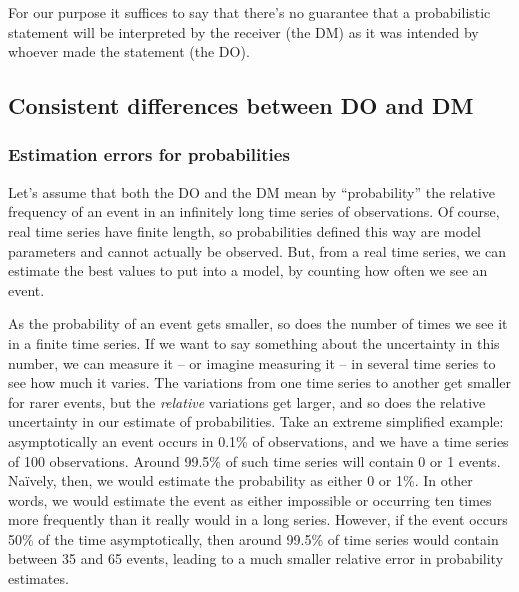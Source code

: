\documentclass[a4paper, 12pt]{article}
\newcommand{\seclabel}[1]{\label{sec:#1}}
\begin{document}
For our purpose it suffices to say that there's no guarantee that a probabilistic statement will be interpreted by the receiver (the DM) as it was intended by whoever made the statement (the DO).

\subsection{Consistent differences between DO and DM \seclabel{condition2}}

\subsubsection*{Estimation errors for probabilities}
Let's assume that both the DO and the DM mean by ``probability'' the relative frequency of an event in an infinitely long time series of observations. Of course, real time series have finite length, so probabilities defined this way are model parameters and cannot actually be observed. But, from a real time series, we can estimate the best values to put into a model, by counting how often we see an event.

As the probability of an event gets smaller, so does the number of times we see it in a finite time series. If we want to say something about the uncertainty in this number, we can measure it -- or imagine measuring it -- in several time series to see how much it varies. The variations from one time series to another get smaller for rarer events, but the \textit{relative} variations get larger, and so does the relative uncertainty in our estimate of probabilities. Take an extreme simplified example: asymptotically an event occurs in 0.1\% of observations, and we have a time series of 100 observations.
Around 99.5\% of such time series will contain 0 or 1 events. Na\"{i}vely, then, we would estimate the probability as either 0 or 1\%. In other words, we would estimate the event as either impossible or occurring ten times more frequently than it really would in a long series. However, if the event occurs 50\% of the time asymptotically, then around 99.5\% of time series would contain between 35 and 65 events, leading to a much smaller relative error in probability estimates.
\end{document}
